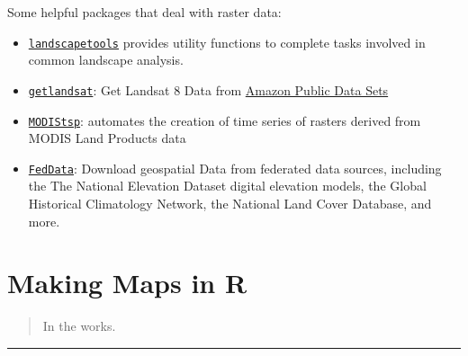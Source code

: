 \documentclass[]{book}
\providecommand{\tightlist}{%
  \setlength{\itemsep}{0pt}\setlength{\parskip}{0pt}}
\begin{document}
Some helpful packages that deal with raster data:

\begin{itemize}
\tightlist
\item
  \href{https://CRAN.R-project.org/package=landscapetools}{\texttt{landscapetools}}
  provides utility functions to complete tasks involved in common
  landscape analysis.
\item
  \href{https://CRAN.R-project.org/package=getlandsat}{\texttt{getlandsat}}:
  Get Landsat 8 Data from
  \href{https://registry.opendata.aws/landsat-8/}{Amazon Public Data
  Sets}
\item
  \href{https://CRAN.R-project.org/package=MODIStsp}{\texttt{MODIStsp}}:
  automates the creation of time series of rasters derived from MODIS
  Land Products data
\item
  \href{https://cran.r-project.org/package=FedData}{\texttt{FedData}}:
  Download geospatial Data from federated data sources, including the
  The National Elevation Dataset digital elevation models, the Global
  Historical Climatology Network, the National Land Cover Database, and
  more.
\end{itemize}

\chapter{Making Maps in R}\label{mapping}

\begin{quote}
In the works.
\end{quote}

\begin{center}\rule{0.5\linewidth}{\linethickness}\end{center}


\end{document}
